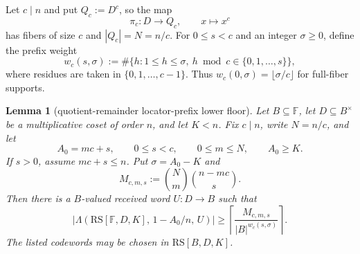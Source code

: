 \documentclass[11pt]{article}
\newtheorem{lemma}[theorem]{Lemma}
\theoremstyle{definition}
\theoremstyle{remark}
\newcommand{\F}{\mathbb{F}}
\newcommand{\B}{B}
\newcommand{\RS}{\mathrm{RS}}
\newcommand{\Lst}{\Lambda}
\begin{document}
Let $c\mid n$ and put $Q_c:=D^c$, so the map
\[
        \pi_c:D\to Q_c,\qquad x\mapsto x^c
\]
has fibers of size $c$ and $|Q_c|=N=n/c$.  For $0\le s<c$ and an integer
$\sigma\ge0$, define the prefix weight
\[
        w_c(s,\sigma)
        :=\#\{h:1\le h\le\sigma,
              \ h\bmod c\in\{0,1,\ldots,s\}\},
\]
where residues are taken in $\{0,1,\ldots,c-1\}$.  Thus
$w_c(0,\sigma)=\lfloor \sigma/c\rfloor$ for full-fiber supports.

\begin{lemma}[quotient-remainder locator-prefix lower floor]
\label{lem:quotient-remainder-prefix}
Let $\B\subseteq\F$, let $D\subseteq\B^\times$ be a multiplicative coset of
order $n$, and let $K<n$.  Fix $c\mid n$, write $N=n/c$, and let
\[
        A_0=mc+s,
        \qquad 0\le s<c,
        \qquad 0\le m\le N,
        \qquad A_0\ge K .
\]
If $s>0$, assume $mc+s\le n$.  Put $\sigma=A_0-K$ and
\[
        M_{c,m,s}:=\binom Nm\binom{n-mc}{s}.
\]
Then there is a $\B$-valued received word $U:D\to\B$ such that
\[
        \bigl|\Lst(\RS[\F,D,K],\,1-A_0/n,\,U)\bigr|
        \ge
        \left\lceil \frac{M_{c,m,s}}{|\B|^{w_c(s,\sigma)}}\right\rceil .
\]
The listed codewords may be chosen in $\RS[\B,D,K]$.
\end{lemma}
\end{document}
